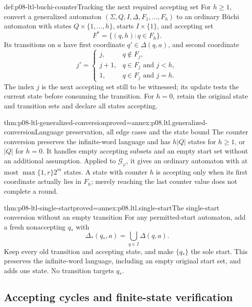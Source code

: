 \begin{hbdefinition}{def:p08-ltl-buchi-counter}{Tracking the next required accepting set}
For \(h\geq1\), convert a generalized automaton
\((\Sigma,Q,I,\Delta,F_1,\ldots,F_h)\) to an ordinary
B\"uchi automaton with states \(Q\times\{1,\ldots,h\}\),
starts \(I\times\{1\}\), and accepting set
\[
 F^*=\{(q,h):q\in F_h\}.
\]
Its transitions on \(a\) have first coordinate
\(q'\in\Delta(q,a)\), and second coordinate
\[
 j'=\begin{cases}
        j,&q\notin F_j,\\
        j+1,&q\in F_j\text{ and }j<h,\\
        1,&q\in F_j\text{ and }j=h.
      \end{cases}
\]
The index \(j\) is the next accepting set still to be
witnessed; its update tests the current state before consuming
the transition. For \(h=0\), retain the original state and
transition sets and declare all states accepting.
\end{hbdefinition}

\begin{hbtheorem}{thm:p08-ltl-generalized-conversion}{proved=annex:p08.ltl.generalized-conversion}{Language preservation, all edge cases and the state bound}
The counter conversion preserves the infinite-word language
and has \(h|Q|\) states for \(h\geq1\), or \(|Q|\) for
\(h=0\). It handles empty accepting subsets and an empty
start set without an additional assumption. Applied to
\(\mathcal G_\varphi\), it gives an ordinary automaton with
at most \(\max\{1,r\}2^m\) states. A state with counter
\(h\) is accepting only when its first coordinate actually
lies in \(F_h\); merely reaching the last counter value
does not complete a round.
\end{hbtheorem}

\begin{hbtheorem}{thm:p08-ltl-single-start}{proved=annex:p08.ltl.single-start}{The single-start conversion without an empty transition}
For any permitted-start automaton, add a fresh nonaccepting
\(q_*\) with
\[
 \Delta_*(q_*,a)=\bigcup_{q\in I}\Delta(q,a).
\]
Keep every old transition and accepting state, and make
\(\{q_*\}\) the sole start. This preserves the infinite-word
language, including an empty original start set, and adds one
state. No transition targets \(q_*\).
\end{hbtheorem}

\subsection{Accepting cycles and finite-state verification}
\label{sec:p08-ltl-accepting-cycles}

